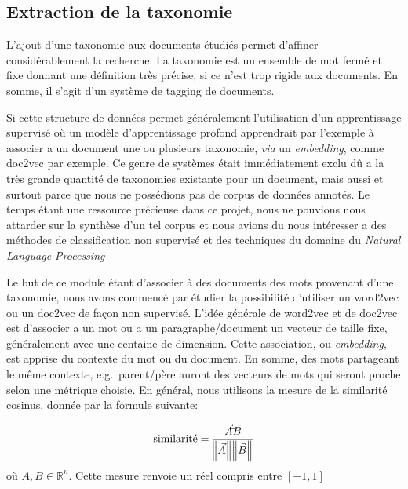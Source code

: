 
\subsection{Extraction de la taxonomie}
L'ajout d'une taxonomie aux documents étudiés permet d'affiner considérablement la recherche.
La taxonomie est un ensemble de mot fermé et fixe donnant une définition très précise, si ce n'est trop rigide aux documents.
En somme, il s'agit d'un système de tagging de documents. 

Si cette structure de données permet généralement l'utilisation d'un apprentissage supervisé où un modèle d'apprentissage profond apprendrait par l'exemple à associer a un document une ou plusieurs taxonomie, \textit{via} un \textit{embedding}, comme doc2vec\cite{doc2vec} par exemple.
Ce genre de systèmes était immédiatement exclu dû a la très grande quantité de taxonomies existante pour un document, mais aussi et surtout parce que nous ne possédions pas de corpus de données annotés.
Le temps étant une ressource précieuse dans ce projet, nous ne pouvions nous attarder sur la synthèse d'un tel corpus et nous avions du nous intéresser a des méthodes de classification non supervisé et des techniques du domaine du \textit{Natural Language Processing}

Le but de ce module étant d'associer à des documents des mots provenant d'une taxonomie, nous avons commencé par étudier la possibilité d'utiliser un word2vec\cite{word2vec} ou un doc2vec de façon non supervisé.
L'idée générale de word2vec et de doc2vec est d'associer a un mot ou a un paragraphe/document un vecteur de taille fixe, généralement avec une centaine de dimension. Cette association, ou \textit{embedding}, est apprise du contexte du mot ou du document.
En somme, des mots partageant le même contexte, e.g.\ parent/père auront des vecteurs de mots qui seront proche selon une métrique choisie.
En général, nous utilisons la mesure de la similarité cosinus, donnée par la formule suivante:

\begin{equation}
	\text{similarité} = \frac{\vec{A} \dot \vec{B}}{\norm{\vec{A}}\norm{\vec{B}}}
	\label{eq:distCosine}
\end{equation}
où $A, B  \in \mathbb{R}^n$. Cette mesure renvoie un réel compris entre $[-1, 1]$

